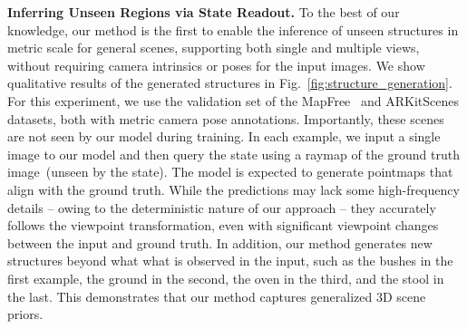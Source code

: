 \vspace{0.5em}
\noindent\textbf{Inferring Unseen Regions via State Readout.} 
To the best of our knowledge, our method is the first to enable the inference of unseen structures in metric scale for general scenes, supporting both single and multiple views, without requiring camera intrinsics or poses for the input images.
We show qualitative results of the generated structures in Fig.~\ref{fig:structure_generation}. 
For this experiment, we use the validation set of the MapFree~\cite{arnold2022mapfree} and ARKitScenes datasets, both with metric camera pose annotations. Importantly, these scenes are not seen by our model during training. 
In each example, we input a single image to our model and then query the state using a raymap of the ground truth image~(unseen by the state). The model is expected to generate pointmaps that align with the ground truth. 
While the predictions may lack some high-frequency details -- owing to the deterministic nature of our approach -- they accurately follows the
viewpoint transformation, 
even with significant viewpoint changes between the input and ground truth. In addition, our method generates new structures beyond what what is observed in the input, such as the bushes in the first example, the ground in the second, the oven in the third, and the stool in the last.  This demonstrates that our method captures generalized 3D scene priors.




